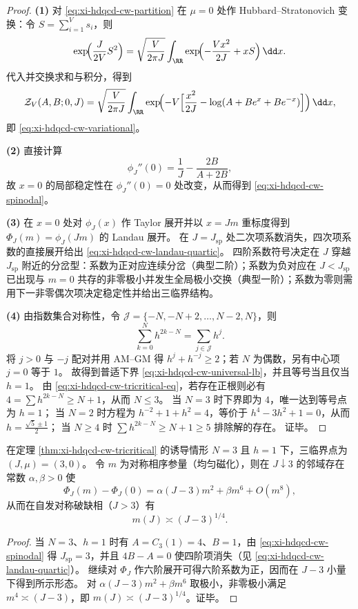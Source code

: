 \begin{proof}
\textbf{(1)} 对 \eqref{eq:xi-hdqcd-cw-partition} 在 \(\mu=0\) 处作 Hubbard--Stratonovich 变换：令 \(S=\sum_{i=1}^{V}s_i\)，则
\[
\exp\!\Bigl(\frac{J}{2V}S^{2}\Bigr)
=\sqrt{\frac{V}{2\pi J}}\int_{\RR}\exp\!\Bigl(-\frac{Vx^{2}}{2J}+xS\Bigr)\,\dd x.
\]
代入并交换求和与积分，得到
\[
\mathcal Z_V(A,B;0,J)
=\sqrt{\frac{V}{2\pi J}}\int_{\RR}
\exp\!\Bigl(-V\Bigl[\frac{x^{2}}{2J}-\log(A+Be^{x}+Be^{-x})\Bigr]\Bigr)\,\dd x,
\]
即 \eqref{eq:xi-hdqcd-cw-variational}。
\par
\textbf{(2)} 直接计算
\[
\phi_J''(0)=\frac{1}{J}-\frac{2B}{A+2B},
\]
故 \(x=0\) 的局部稳定性在 \(\phi_J''(0)=0\) 处改变，从而得到 \eqref{eq:xi-hdqcd-cw-spinodal}。
\par
\textbf{(3)} 在 \(x=0\) 处对 \(\phi_J(x)\) 作 Taylor 展开并以 \(x=Jm\) 重标度得到 \(\Phi_J(m)=\phi_J(Jm)\) 的 Landau 展开。
在 \(J=J_{\mathrm{sp}}\) 处二次项系数消失，四次项系数的直接展开给出 \eqref{eq:xi-hdqcd-cw-landau-quartic}。
四阶系数符号决定在 \(J\) 穿越 \(J_{\mathrm{sp}}\) 附近的分岔型：系数为正对应连续分岔（典型二阶）；系数为负对应在 \(J<J_{\mathrm{sp}}\) 已出现与 \(m=0\) 共存的非零极小并发生全局极小交换（典型一阶）；系数为零则需用下一非零偶次项决定稳定性并给出三临界结构。
\par
\textbf{(4)} 由指数集合对称性，令 \(\mathcal J=\{-N,-N+2,\dots,N-2,N\}\)，则
\[
\sum_{k=0}^{N}h^{2k-N}=\sum_{j\in\mathcal J}h^{j}.
\]
将 \(j>0\) 与 \(-j\) 配对并用 AM--GM 得 \(h^{j}+h^{-j}\ge 2\)；若 \(N\) 为偶数，另有中心项 \(j=0\) 等于 \(1\)。
故得到普适下界 \eqref{eq:xi-hdqcd-cw-universal-lb}，并且等号当且仅当 \(h=1\)。
由 \eqref{eq:xi-hdqcd-cw-tricritical-eq}，若存在正根则必有 \(4=\sum h^{2k-N}\ge N+1\)，从而 \(N\le 3\)。
当 \(N=3\) 时下界即为 \(4\)，唯一达到等号点为 \(h=1\)；
当 \(N=2\) 时方程为 \(h^{-2}+1+h^{2}=4\)，等价于 \(h^{4}-3h^{2}+1=0\)，从而
\(
h=\frac{\sqrt5\pm 1}{2}
\)；
当 \(N\ge 4\) 时 \(\sum h^{2k-N}\ge N+1\ge 5\) 排除解的存在。
证毕。
\end{proof}

\begin{corollary}\label{cor:xi-hdqcd-su3-tricritical-exponent}
在定理 \ref{thm:xi-hdqcd-cw-tricritical} 的诱导情形 \(N=3\) 且 \(h=1\) 下，三临界点为 \((J,\mu)=(3,0)\)。
令 \(m\) 为对称相序参量（均匀磁化），则在 \(J\downarrow 3\) 的邻域存在常数 \(\alpha,\beta>0\) 使
\[
\Phi_J(m)-\Phi_J(0)=\alpha(J-3)m^{2}+\beta m^{6}+O(m^{8}),
\]
从而在自发对称破缺相（\(J>3\)）有
\[
m(J)\asymp (J-3)^{1/4}.
\]
\end{corollary}

\begin{proof}
当 \(N=3\)、\(h=1\) 时有 \(A=C_3(1)=4\)、\(B=1\)，由 \eqref{eq:xi-hdqcd-cw-spinodal} 得 \(J_{\mathrm{sp}}=3\)，并且 \(4B-A=0\) 使四阶项消失（见 \eqref{eq:xi-hdqcd-cw-landau-quartic}）。
继续对 \(\Phi_J\) 作六阶展开可得六阶系数为正，因而在 \(J-3\) 小量下得到所示形态。
对 \(\alpha(J-3)m^{2}+\beta m^{6}\) 取极小，非零极小满足 \(m^{4}\asymp (J-3)\)，即 \(m(J)\asymp (J-3)^{1/4}\)。证毕。
\end{proof}

\endinput
